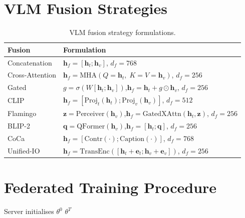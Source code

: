 \documentclass[12pt, a4paper, oneside]{Thesis}
\begin{document}
\section{VLM Fusion Strategies}

\begin{table}[H]\centering
\small
\begin{tabular}{p{2.2cm}p{9.5cm}}
\toprule
\textbf{Fusion} & \textbf{Formulation}\\
\midrule
Concatenation      & $\mathbf{h}_f = [\mathbf{h}_t;\mathbf{h}_v]$, $d_f=768$\\[3pt]
Cross-Attention \cite{Vaswani2017}  & $\mathbf{h}_f = \mathrm{MHA}(Q{=}\mathbf{h}_t,\;K{=}V{=}\mathbf{h}_v)$, $d_f=256$\\[3pt]
Gated              & $g=\sigma(W[\mathbf{h}_t;\mathbf{h}_v])$,\;$\mathbf{h}_f = \mathbf{h}_t + g\odot\mathbf{h}_v$, $d_f=256$\\[3pt]
CLIP \cite{Radford2021}             & $\mathbf{h}_f = [\mathrm{Proj}_t(\mathbf{h}_t);\mathrm{Proj}_v(\mathbf{h}_v)]$, $d_f=512$\\[3pt]
Flamingo \cite{Alayrac2022}         & $\mathbf{z}=\mathrm{Perceiver}(\mathbf{h}_v)$,\;$\mathbf{h}_f=\mathrm{GatedXAttn}(\mathbf{h}_t,\mathbf{z})$, $d_f=256$\\[3pt]
BLIP-2 \cite{Li2023}                & $\mathbf{q}=\mathrm{QFormer}(\mathbf{h}_v)$,\;$\mathbf{h}_f=[\mathbf{h}_t;\mathbf{q}]$, $d_f=256$\\[3pt]
CoCa \cite{Yu2022}                  & $\mathbf{h}_f = [\mathrm{Contr}(\cdot);\mathrm{Caption}(\cdot)]$, $d_f=768$\\[3pt]
Unified-IO \cite{Lu2022}            & $\mathbf{h}_f = \mathrm{TransEnc}([\mathbf{h}_t{+}\mathbf{e}_t;\mathbf{h}_v{+}\mathbf{e}_v])$, $d_f=256$\\
\bottomrule
\end{tabular}
\caption{VLM fusion strategy formulations.}
\label{tab:vlmfusions}
\end{table}

\section{Federated Training Procedure}

\begin{algorithm}[H]
\DontPrintSemicolon
\SetAlgoLined
\caption{FarmFederate with FedAvg}
Server initialises $\theta^0$\;
\Return $\theta^T$\;
\end{algorithm}
\end{document}

